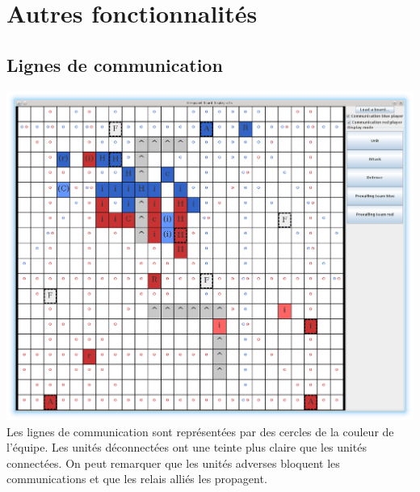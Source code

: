 			\clearpage

	\section{Autres fonctionnalités}

		\subsection{Lignes de communication}
			\includegraphics[scale=0.4]{images/screen4.eps}
			Les lignes de communication sont représentées par des cercles de la couleur de l'équipe.
			Les unités déconnectées ont une teinte plus claire que les unités connectées.
			On peut remarquer que les unités adverses bloquent les communications et que les relais alliés les propagent.

			\clearpage